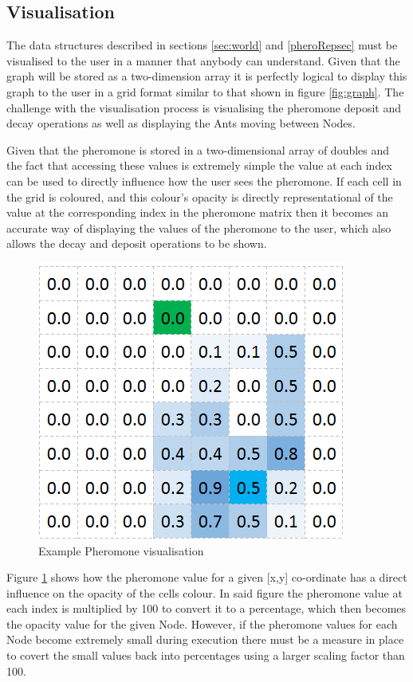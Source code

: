 \subsection{Visualisation}

The data structures described in sections \ref{sec:world} and \ref{pheroRepsec} must be visualised to the user in a manner that anybody can understand. Given that the graph will be stored as a two-dimension array it is perfectly logical to display this graph to the user in a grid format similar to that shown in figure \ref{fig:graph}. The challenge with the visualisation process is visualising the pheromone deposit and decay operations as well as displaying the Ants moving between Nodes.

Given that the pheromone is stored in a two-dimensional array of doubles and the fact that accessing these values is extremely simple the value at each index can be used to directly influence how the user sees the pheromone. If each cell in the grid is coloured, and this colour's opacity is directly representational of the value at the corresponding index in the pheromone matrix then it becomes an accurate way of displaying the values of the pheromone to the user, which also allows the decay and deposit operations to be shown.

\begin{figure}[H]
\centering
\includegraphics[scale=0.8]{Images/design/pheroEX}
\caption{Example Pheromone visualisation}
\label{fig:pheroVis}
\end{figure}

\noindent
Figure \ref{fig:pheroVis} shows how the pheromone value for a given [x,y] co-ordinate has a direct influence on the opacity of the cells colour. In said figure the pheromone value at each index is multiplied by 100 to convert it to a percentage, which then becomes the opacity value for the given Node. However, if the pheromone values for each Node become extremely small during execution there must be a measure in place to covert the small values back into percentages using a larger scaling factor than 100.


\clearpage